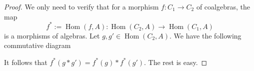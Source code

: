 \documentclass{article}
\theoremstyle{plain}
\theoremstyle{definition}
\DeclareMathOperator{\Hom}{Hom}
\begin{document}
\begin{proof}
    We only need to verify that for a morphism $f\colon C_1\to C_2$ of coalgebras, the map 
    \[
    f^\ast:=\Hom(f,A)\colon \Hom(C_2,A)\to \Hom(C_1,A)
    \]
    is a morphisms of algebras. Let $g,g'\in \Hom(C_2,A)$. We have the following commutative diagram 
     \begin{center}
    \end{center}
    It follows that $f^\ast(g\ast g')=f^\ast(g)\ast f^\ast(g')$. The rest is easy. 
\end{proof}
\end{document}
